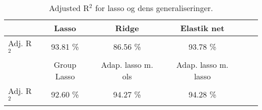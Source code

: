 \begin{table}[ht]
\center
\begin{tabular}{lccccc}
\toprule
& Lasso & Ridge & Elastik net \\ \midrule
Adj. R$^2$ & 93.81 \%  & 86.56 \% & 93.78 \%  \\ \bottomrule \toprule 
& Group Lasso & Adap. lasso m. ols & Adap. lasso m. lasso  \\ \midrule
Adj. R$^2$ & 92.60 \% & 94.27 \%  & 94.28 \% \\ \bottomrule 
 \end{tabular}
\caption{Adjusted R$^2$ for lasso og dens generaliseringer.} \label{tab:adj_r2_shrinkage_tab}
\end{table}